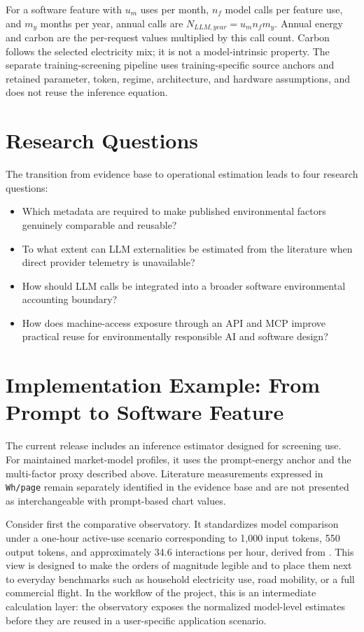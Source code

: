 \documentclass[11pt,a4paper]{article}
\begin{document}
For a software feature with $u_m$ uses per month, $n_f$ model calls per feature use, and $m_y$ months per year, annual calls are $N_{LLM,year}=u_m n_f m_y$. Annual energy and carbon are the per-request values multiplied by this call count. Carbon follows the selected electricity mix; it is not a model-intrinsic property. The separate training-screening pipeline uses training-specific source anchors and retained parameter, token, regime, architecture, and hardware assumptions, and does not reuse the inference equation.

\section{Research Questions}
The transition from evidence base to operational estimation leads to four research questions:
\begin{itemize}
\item Which metadata are required to make published environmental factors genuinely comparable and reusable?
\item To what extent can LLM externalities be estimated from the literature when direct provider telemetry is unavailable?
\item How should LLM calls be integrated into a broader software environmental accounting boundary?
\item How does machine-access exposure through an API and MCP improve practical reuse for environmentally responsible AI and software design?
\end{itemize}

\section{Implementation Example: From Prompt to Software Feature}
The current release includes an inference estimator designed for screening use. For maintained market-model profiles, it uses the prompt-energy anchor and the multi-factor proxy described above. Literature measurements expressed in \texttt{Wh/page} remain separately identified in the evidence base and are not presented as interchangeable with prompt-based chart values.

Consider first the comparative observatory. It standardizes model comparison under a one-hour active-use scenario corresponding to 1,000 input tokens, 550 output tokens, and approximately 34.6 interactions per hour, derived from \cite{brysbaert2019}. This view is designed to make the orders of magnitude legible and to place them next to everyday benchmarks such as household electricity use, road mobility, or a full commercial flight. In the workflow of the project, this is an intermediate calculation layer: the observatory exposes the normalized model-level estimates before they are reused in a user-specific application scenario.
\end{document}
